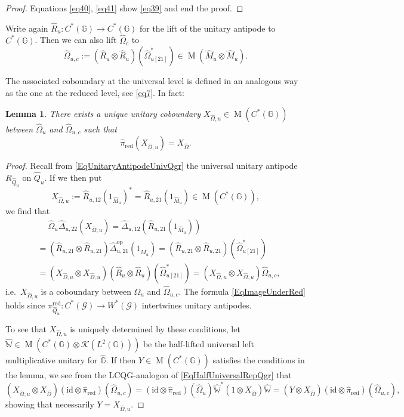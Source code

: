 \documentclass[reqno]{amsart}
\numberwithin{equation}{section}
\newtheorem{Lem}[Theorem]{Lemma}
\newcommand{\mcK}{\mathcal{K}}
\newcommand{\id}{\mathrm{id}}
\newcommand{\G}{\mathbb{G}}
\newcommand{\opp}{\mathrm{op}}
\newcommand{\msG}{\mathscr{G}}
\newcommand{\red}{\mathrm{red}}
\newcommand{\Mult}{\operatorname{M}}
\newcommand{\Ww}{\mathds{W}}
\begin{document}
\begin{proof}
Equations \eqref{eq40}, \eqref{eq41} show \eqref{eq39} and end the proof.
\end{proof}

Write again $\hat{R}_u\colon C^*(\G) \rightarrow C^*(\G)$ for the lift of the unitary antipode to $C^*(\G)$. Then we can also lift $\hat{\Omega}_c$ to 
\begin{equation}\label{EqConjCocy}
\hat{\Omega}_{u,c} :=  (\hat{R}_u\otimes \hat{R}_u)(\hat{\Omega}_{u[21]}^*) \in \Mult(\hat{M}_u \otimes \hat{M}_u). 
\end{equation}

The associated coboundary at the universal level is defined in an analogous way as the one at the reduced level, see \eqref{eq7}. In fact:

\begin{Lem}\label{LemUniqueUnitCob}
There exists a unique unitary coboundary $X_{\hat{\Omega},u} \in \Mult(C^*(\G))$ between  $\hat{\Omega}_u$ and $\hat{\Omega}_{u,c}$ such that 
\begin{equation}\label{EqImageUnderRed}
\hat{\pi}_{\red}(X_{\hat{\Omega},u}) = X_{\hat{\Omega}}.
\end{equation}
\end{Lem}

\begin{proof}
Recall from \eqref{EqUnitaryAntipodeUnivQgr} the universal unitary antipode $R_{\hat{Q}_u}$ on $\hat{Q}_u$. If we then put \[
X_{\hat{\Omega},u} := \hat{R}_{u,12}(1_{\hat{M}_u})^* =\hat{R}_{u,21}(1_{\hat{M}_u}) \in \Mult(C^*(\G)),
\]
 we find that 
\[\begin{split}
&\quad\;\hat{\Omega}_u\hat{\Delta}_{u,22}(X_{\hat{\Omega},u}) = \hat{\Delta}_{u,12}(\hat{R}_{u,21}(1_{\hat{M}_u}))\\
&= (\hat{R}_{u,21}\otimes \hat{R}_{u,21})\hat{\Delta}^{\opp}_{u,21}(1_{\hat{M}_u})=
(\hat{R}_{u,21}\otimes \hat{R}_{u,21})(\hat{\Omega}^*_{u[21]})\\
&
= (X_{\hat{\Omega},u}\otimes X_{\hat{\Omega},u})(\hat{R}_u\otimes \hat{R}_u)(\hat{\Omega}_{u[21]}^*)
=  (X_{\hat{\Omega},u}\otimes X_{\hat{\Omega},u})\hat{\Omega}_{u,c},
\end{split}\]
i.e.~$X_{\hat{\Omega},u}$ is a coboundary between $\hat{\Omega}_u$ and $\hat{\Omega}_{u,c}$. The formula \eqref{EqImageUnderRed} holds since $\pi^{\red}_{\hat{Q}_u}\colon C^*(\msG) \rightarrow W^*(\msG)$ intertwines unitary antipodes. 

To see that $X_{\hat{\Omega},u}$ is uniquely determined by these conditions, let $\hat{\Ww} \in \Mult( C^*(\G)\otimes \mcK(L^2(\G)))$ be the half-lifted universal left multiplicative unitary for $\hat{\G}$. If then $Y \in \Mult(C^*(\G))$ satisfies the conditions in the lemma, we see from the LCQG-analogon of \eqref{EqHalfUniversalRepQgr} that 
\[
(X_{\hat{\Omega},u}\otimes X_{\hat{\Omega}})(\id\otimes \hat{\pi}_{\red})(\hat{\Omega}_{u,c})=
(\id\otimes \hat{\pi}_{\red})(\hat{\Omega}_u)\hat{\Ww}^* (1\otimes X_{\hat{\Omega}})\hat{\Ww} = (Y\otimes X_{\hat{\Omega}})(\id\otimes \hat{\pi}_{\red})(\hat{\Omega}_{u,c}),
\]
showing that necessarily $Y = X_{\hat{\Omega},u}$. 
\end{proof}
\end{document}
